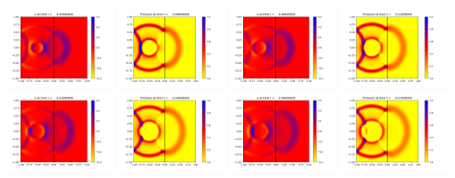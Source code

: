 \documentclass[11pt]{article}
\begin{document}
\includegraphics[width=0.2375\textwidth]{frame0015fig1.png}
\vskip 10pt 
\includegraphics[width=0.2375\textwidth]{frame0016fig0.png}
\includegraphics[width=0.2375\textwidth]{frame0016fig1.png}
\includegraphics[width=0.2375\textwidth]{frame0017fig0.png}
\includegraphics[width=0.2375\textwidth]{frame0017fig1.png}
\vskip 10pt 
\includegraphics[width=0.2375\textwidth]{frame0018fig0.png}
\includegraphics[width=0.2375\textwidth]{frame0018fig1.png}
\includegraphics[width=0.2375\textwidth]{frame0019fig0.png}
\end{document}
